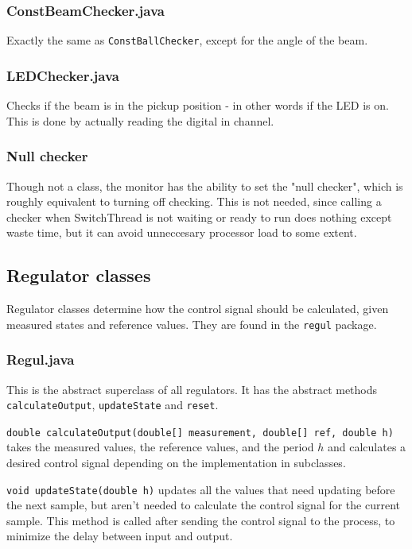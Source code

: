\subsubsection{ConstBeamChecker.java}
Exactly the same as \texttt{ConstBallChecker}, except for the angle of the beam.

\subsubsection{LEDChecker.java}
Checks if the beam is in the pickup position - in other words if the LED is on. This is done by actually reading the digital in channel.

\subsubsection{Null checker}
Though not a class, the monitor has the ability to set the "null checker", which is roughly equivalent to turning off checking. This is not needed, since calling a checker when SwitchThread is not waiting or ready to run does nothing except waste time, but it can avoid unneccesary processor load to some extent.

\subsection{Regulator classes}
Regulator classes determine how the control signal should be calculated, given measured states and reference values. They are found in the \texttt{regul} package.

\subsubsection{Regul.java}
This is the abstract superclass of all regulators. It has the abstract methods \texttt{calculateOutput}, \texttt{updateState} and \texttt{reset}.

\texttt{double calculateOutput(double[] measurement, double[] ref, double h)} takes the measured values, the reference values, and the period $h$ and calculates a desired control signal depending on the implementation in subclasses.

\texttt{void updateState(double h)} updates all the values that need updating before the next sample, but aren't needed to calculate the control signal for the current sample. This method is called after sending the control signal to the process, to minimize the delay between input and output.

